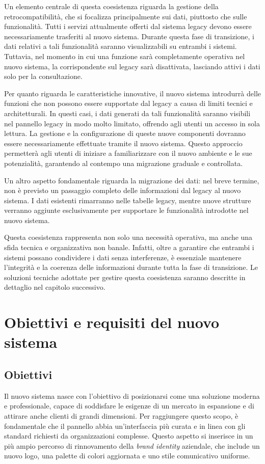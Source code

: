 Un elemento centrale di questa coesistenza riguarda la gestione della retrocompatibilità, che si focalizza principalmente sui dati, piuttosto che sulle funzionalità. Tutti i servizi attualmente offerti dal sistema legacy devono essere necessariamente trasferiti al nuovo sistema. Durante questa fase di transizione, i dati relativi a tali funzionalità saranno visualizzabili su entrambi i sistemi. Tuttavia, nel momento in cui una funzione sarà completamente operativa nel nuovo sistema, la corrispondente sul legacy sarà disattivata, lasciando attivi i dati solo per la consultazione.

Per quanto riguarda le caratteristiche innovative, il nuovo sistema introdurrà delle funzioni che non possono essere supportate dal legacy a causa di limiti tecnici e architetturali. In questi casi, i dati generati da tali funzionalità saranno visibili nel pannello legacy in modo molto limitato, offrendo agli utenti un accesso in sola lettura. La gestione e la configurazione di queste nuove componenti dovranno essere necessariamente effettuate tramite il nuovo sistema. Questo approccio permetterà agli utenti di iniziare a familiarizzare con il nuovo ambiente e le sue potenzialità, garantendo al contempo una migrazione graduale e controllata.

Un altro aspetto fondamentale riguarda la migrazione dei dati: nel breve termine, non è previsto un passaggio completo delle informazioni dal legacy al nuovo sistema. I dati esistenti rimarranno nelle tabelle legacy, mentre nuove strutture verranno aggiunte esclusivamente per supportare le funzionalità introdotte nel nuovo sistema.

Questa coesistenza rappresenta non solo una necessità operativa, ma anche una sfida tecnica e organizzativa non banale. Infatti, oltre a garantire che entrambi i sistemi possano condividere i dati senza interferenze, è essenziale mantenere l’integrità e la coerenza delle informazioni durante tutta la fase di transizione. Le soluzioni tecniche adottate per gestire questa coesistenza saranno descritte in dettaglio nel capitolo successivo.

\section{Obiettivi e requisiti del nuovo sistema}
\subsection{Obiettivi}
Il nuovo sistema nasce con l'obiettivo di posizionarsi come una soluzione moderna e professionale, capace di soddisfare le esigenze di un mercato in espansione e di attirare anche clienti di grandi dimensioni. Per raggiungere questo scopo, è fondamentale che il pannello abbia un'interfaccia più curata e in linea con gli standard richiesti da organizzazioni complesse. Questo aspetto si inserisce in un più ampio percorso di rinnovamento della  \textit{brand identity} aziendale, che include un nuovo logo, una palette di colori aggiornata e uno stile comunicativo uniforme.

